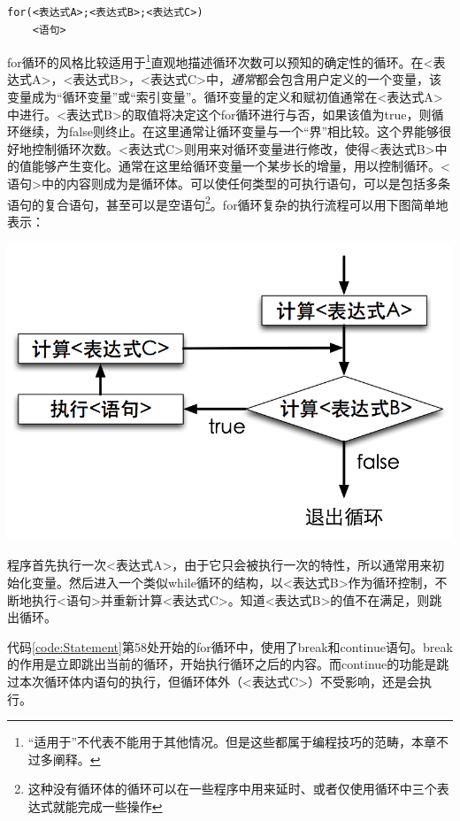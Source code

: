 \begin{lstlisting}[xleftmargin=6em,xrightmargin=6em]
for(<表达式A>;<表达式B>;<表达式C>)
    <语句>
\end{lstlisting}

for循环的风格比较适用于\footnote{“适用于”不代表不能用于其他情况。但是这些都属于编程技巧的范畴，本章不过多阐释。}直观地描述循环次数可以预知的确定性的循环。在<表达式A>，<表达式B>，<表达式C>中，\emph{通常}都会包含用户定义的一个变量，该变量成为“循环变量”或“索引变量”。循环变量的定义和赋初值通常在<表达式A>中进行。<表达式B>的取值将决定这个for循环进行与否，如果该值为true，则循环继续，为false则终止。在这里通常让循环变量与一个“界”相比较。这个界能够很好地控制循环次数。<表达式C>则用来对循环变量进行修改，使得<表达式B>中的值能够产生变化。通常在这里给循环变量一个某步长的增量，用以控制循环。<语句>中的内容则成为是循环体。可以使任何类型的可执行语句，可以是包括多条语句的复合语句，甚至可以是空语句\footnote{这种没有循环体的循环可以在一些程序中用来延时、或者仅使用循环中三个表达式就能完成一些操作}。for循环复杂的执行流程可以用下图简单地表示：

\begin{center}
\includegraphics{fig/1-6/4_for_statement.png}
\end{center}

程序首先执行一次<表达式A>，由于它只会被执行一次的特性，所以通常用来初始化变量。然后进入一个类似while循环的结构，以<表达式B>作为循环控制，不断地执行<语句>并重新计算<表达式C>。知道<表达式B>的值不在满足，则跳出循环。

代码\ref{code:Statement}第58处开始的for循环中，使用了break和continue语句。break的作用是立即跳出当前的循环，开始执行循环之后的内容。而continue的功能是跳过本次循环体内语句的执行，但循环体外（<表达式C>）不受影响，还是会执行。

